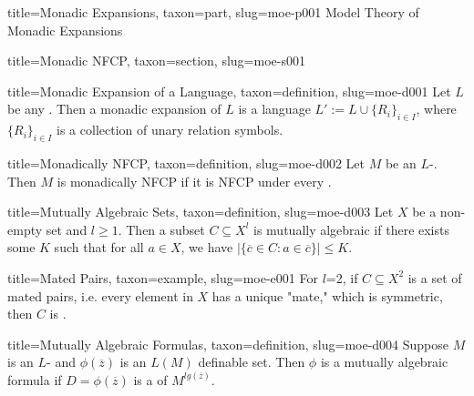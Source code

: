 \documentclass[a4paper]{article}
\begin{document}
  
  
\begin{tree}{title={Monadic Expansions}, taxon={part}, slug={moe-p001}}
Model Theory of Monadic Expansions
  
  
\begin{tree}{title={Monadic NFCP}, taxon={section}, slug={moe-s001}}

\begin{tree}{title={Monadic Expansion of a Language}, taxon={definition}, slug={moe-d001}}
Let \(L\) be any . Then a monadic expansion of \(L\) is a language \(L':= L \cup \{ R_i \} _{i \in  I}\), where \(\{ R_i \} _{i \in  I}\) is a collection of unary relation symbols.
\end{tree}

\begin{tree}{title={Monadically NFCP}, taxon={definition}, slug={moe-d002}}
Let \(M\) be an \(L\)-. Then \(M\) is monadically NFCP if it is NFCP under every .
\end{tree}

\begin{tree}{title={Mutually Algebraic Sets}, taxon={definition}, slug={moe-d003}}
Let \(X\) be a non-empty set and \(l \geq1\). Then a subset \(C \subseteq  X^l\) is mutually algebraic if there exists some \(K\) such that for all \(a \in  X\), we have \(| \{ \overline {c} \in  C: a \in \overline {c} \} | \leq  K\).
\end{tree}

\begin{tree}{title={Mated Pairs}, taxon={example}, slug={moe-e001}}
For \(l\)=2, if \(C \subseteq  X^2\) is a set of mated pairs, i.e. every element in \(X\) has a unique "mate," which is symmetric, then \(C\) is .
\end{tree}

\begin{tree}{title={Mutually Algebraic Formulas}, taxon={definition}, slug={moe-d004}}
Suppose \(M\) is an \(L\)- and \(\phi ( \overline {z})\) is an \(L(M)\) definable set. Then \(\phi\) is a mutually algebraic formula if \(D= \phi ( \overline {z})\) is a  of \(M^{lg( \overline {z})}\).
\end{tree}

\end{tree}


\end{tree}


\printbibliography
\end{document}
